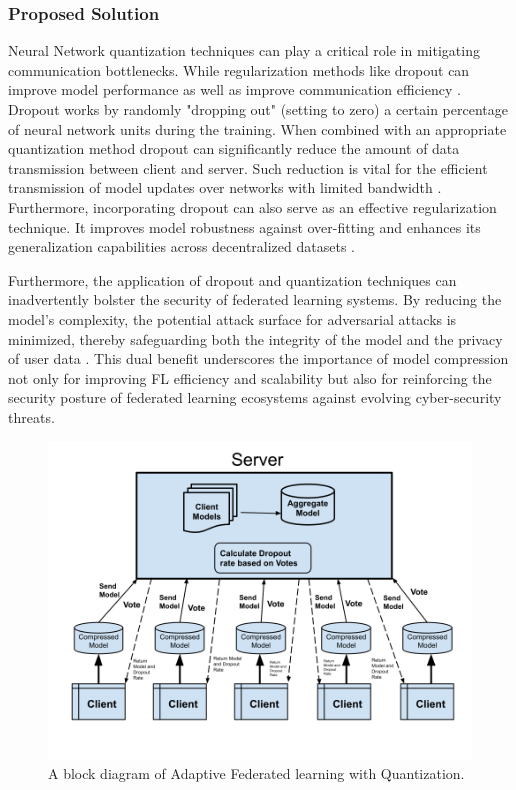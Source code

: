 \documentclass{article}
\begin{document}
\subsubsection{Proposed Solution}

Neural Network quantization techniques can play a critical role in mitigating communication bottlenecks. While regularization methods like dropout can improve model performance as well as improve communication efficiency \cite{srivastava2014dropout}. Dropout works by  randomly "dropping out" (setting to zero) a certain percentage of neural network units during the training. When combined with an appropriate quantization method dropout can significantly reduce the amount of data transmission between client and server. Such reduction is vital for the efficient transmission of model updates over networks with limited bandwidth \cite{10472332}. Furthermore, incorporating dropout can also serve as an effective regularization technique. It improves model robustness against over-fitting and enhances its generalization capabilities across decentralized datasets \cite{srivastava2014dropout,DBLP:journals/corr/abs-2109-15258}.\par

Furthermore, the application of dropout and quantization techniques can inadvertently bolster the security of federated learning systems. By reducing the model's complexity, the potential attack surface for adversarial attacks is minimized, thereby safeguarding both the integrity of the model and the privacy of user data \cite{TANG2024269}. This dual benefit underscores the importance of model compression not only for improving FL efficiency and scalability but also for reinforcing the security posture of federated learning ecosystems against evolving cyber-security threats.\par

\begin{figure}
  \centering
\includegraphics[width = \linewidth, height = .55\linewidth]{img/1.Fed_Lr.png}
\caption{A block diagram of Adaptive Federated learning with Quantization.}
  \label{fig:fed_lr}
\end{figure}
\end{document}
